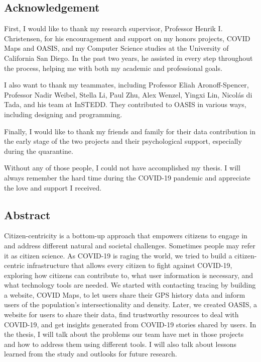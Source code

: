 \documentclass{ucsdreport}
\begin{document}
\begin{spacing}{2}
\section{Acknowledgement}

\tab First, I would like to thank my research supervisor, Professor Henrik I. 
Christensen, for his encouragement and support on my honors projects, COVID
Maps and OASIS, and my Computer Science studies at the University of California
San Diego. In the past two years, he assisted in every step throughout the
process, helping me with both my academic and professional goals. 

\tab  I also want to thank my teammates, including Professor Eliah Aronoff-Spencer, 
Professor Nadir Weibel, Stella Li, Paul Zhu, Alex Wenzel, Yingxi Lin, 
Nicolás di Tada, and his team at InSTEDD. They contributed to OASIS in various
ways, including designing and programming.

\tab  Finally, I would like to thank my friends and family for their data contribution 
in the early stage of the two projects and their psychological support, 
especially during the quarantine. 

\tab  Without any of those people, I could not have accomplished my thesis. I will always 
remember the hard time during the COVID-19 pandemic and appreciate the love 
and support I received.

\end{spacing}
\newpage
\begin{spacing}{2}
\section{Abstract} 
\tab Citizen-centricity is a bottom-up approach that empowers citizens to engage
in and address different natural and societal challenges. Sometimes people may 
refer it as citizen science. As COVID-19 is
raging the world, we tried to build a citizen-centric infrastructure that
allows every citizen to fight against COVID-19, exploring how citizens can
contribute to, what user information is necessary, and what technology tools
are needed. We started with contacting tracing by building a website, COVID
Maps, to let users share their GPS history data and inform users of the
population's intersectionality and density. Later, we created OASIS, a website
for users to share their data, find trustworthy resources to deal with 
COVID-19, and get insights generated from COVID-19 stories shared by users.
In the thesis, I will talk about the problems our team have met in those projects 
and how to address them using different tools. I will also talk about lessons
learned from the study and outlooks for future research. 
\end{spacing}
\newpage
\end{document}
